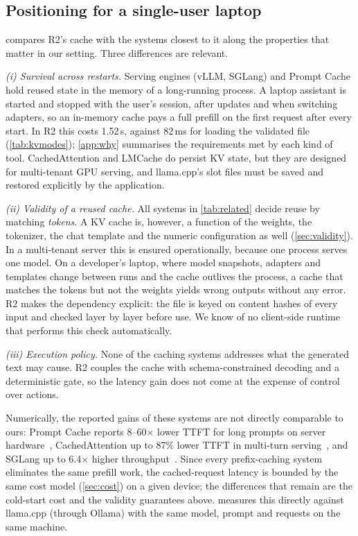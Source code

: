 \documentclass[10pt,twocolumn,letterpaper]{article}
\theoremstyle{definition}
\begin{document}
\subsection{Positioning for a single-user laptop}\label{sec:position}

 compares R2's cache with the systems closest to it along the properties that
matter in our setting. Three differences are relevant.

\emph{(i) Survival across restarts.} Serving engines (vLLM, SGLang) and Prompt Cache hold reused
state in the memory of a long-running process. A laptop assistant is started and stopped with the
user's session, after updates and when switching adapters, so an in-memory cache pays a full
prefill on the first request after every start. In R2 this costs 1.52\,s, against 82\,ms for
loading the validated file (\cref{tab:kvmodes}); \cref{app:why} summarises the requirements met by each kind of tool. CachedAttention and LMCache do persist KV state,
but they are designed for multi-tenant GPU serving, and llama.cpp's slot files must be saved and
restored explicitly by the application.

\emph{(ii) Validity of a reused cache.} All systems in \cref{tab:related} decide reuse by matching
\emph{tokens}. A KV cache is, however, a function of the weights, the tokenizer, the chat template
and the numeric configuration as well (\cref{sec:validity}). In a multi-tenant server this is
ensured operationally, because one process serves one model. On a developer's laptop, where model
snapshots, adapters and templates change between runs and the cache outlives the process, a cache
that matches the tokens but not the weights yields wrong outputs without any error. R2 makes the
dependency explicit: the file is keyed on content hashes of every input and checked layer by layer
before use. We know of no client-side runtime that performs this check automatically.

\emph{(iii) Execution policy.} None of the caching systems addresses what the generated text may
cause. R2 couples the cache with schema-constrained decoding and a deterministic gate, so the
latency gain does not come at the expense of control over actions.

Numerically, the reported gains of these systems are not directly comparable to ours: Prompt Cache
reports 8--60$\times$ lower TTFT for long prompts on server hardware~\cite{gim2024promptcache},
CachedAttention up to 87\% lower TTFT in multi-turn serving~\cite{gao2024cachedattention}, and
SGLang up to 6.4$\times$ higher throughput~\cite{zheng2024sglang}. Since every prefix-caching
system eliminates the same prefill work, the cached-request latency is bounded by the same cost model
(\cref{sec:cost}) on a given device; the differences that remain are the cold-start cost and the
validity guarantees above.  measures this directly against llama.cpp (through
Ollama) with the same model, prompt and requests on the same machine.
\end{document}
